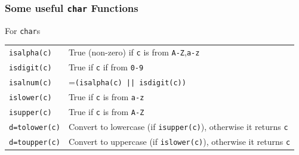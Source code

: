 \documentclass[smaller,table]{beamer}
\begin{document}
\begin{frame}
\frametitle{Some useful {\tt char} Functions}
\begin{block}{For {\tt char}s}
\begin{tabular}{l p{200pt}}
\tt isalpha(c)&True (non-zero) if {\tt c} is from {\tt A-Z},{\tt a-z}\\
\tt isdigit(c)&True if {\tt c} if from {\tt 0-9}\\
\tt isalnum(c)&={\tt (isalpha(c) || isdigit(c))}\\
\tt islower(c)&True if {\tt c} is from {\tt a-z}\\
\tt isupper(c)&True if {\tt c} is from {\tt A-Z}\\
\tt d=tolower(c)&Convert to lowercase (if {\tt isupper(c)}), otherwise it returns {\tt c}\\
\tt d=toupper(c)&Convert to uppercase (if {\tt islower(c)}), otherwise it returns {\tt c}
\end{tabular}
\end{block}
\end{frame}
\end{document}
